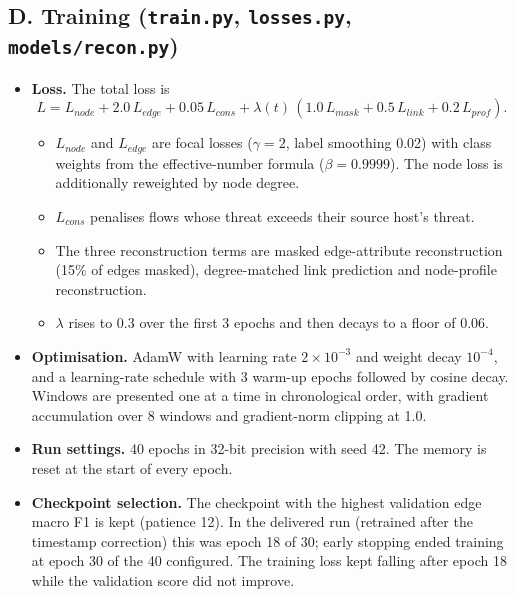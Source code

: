\documentclass[12pt,a4paper]{report}
\begin{document}
\subsection*{D. Training (\texttt{train.py}, \texttt{losses.py}, \texttt{models/recon.py})}
\begin{itemize}
    \item \textbf{Loss.} The total loss is
    \[
    L = L_{node} + 2.0\,L_{edge} + 0.05\,L_{cons} + \lambda(t)\,(1.0\,L_{mask} + 0.5\,L_{link} + 0.2\,L_{prof}).
    \]
    \begin{itemize}
        \item $L_{node}$ and $L_{edge}$ are focal losses ($\gamma=2$, label smoothing 0.02) with class weights from the effective-number formula ($\beta=0.9999$). The node loss is additionally reweighted by node degree.
        \item $L_{cons}$ penalises flows whose threat exceeds their source host's threat.
        \item The three reconstruction terms are masked edge-attribute reconstruction (15\% of edges masked), degree-matched link prediction and node-profile reconstruction.
        \item $\lambda$ rises to 0.3 over the first 3 epochs and then decays to a floor of 0.06.
    \end{itemize}
    \item \textbf{Optimisation.} AdamW with learning rate $2\times10^{-3}$ and weight decay $10^{-4}$, and a learning-rate schedule with 3 warm-up epochs followed by cosine decay. Windows are presented one at a time in chronological order, with gradient accumulation over 8 windows and gradient-norm clipping at 1.0.
    \item \textbf{Run settings.} 40 epochs in 32-bit precision with seed 42. The memory is reset at the start of every epoch.
    \item \textbf{Checkpoint selection.} The checkpoint with the highest validation edge macro F1 is kept (patience 12). In the delivered run (retrained after the timestamp correction) this was epoch 18 of 30; early stopping ended training at epoch 30 of the 40 configured. The training loss kept falling after epoch 18 while the validation score did not improve.
\end{itemize}
\end{document}
